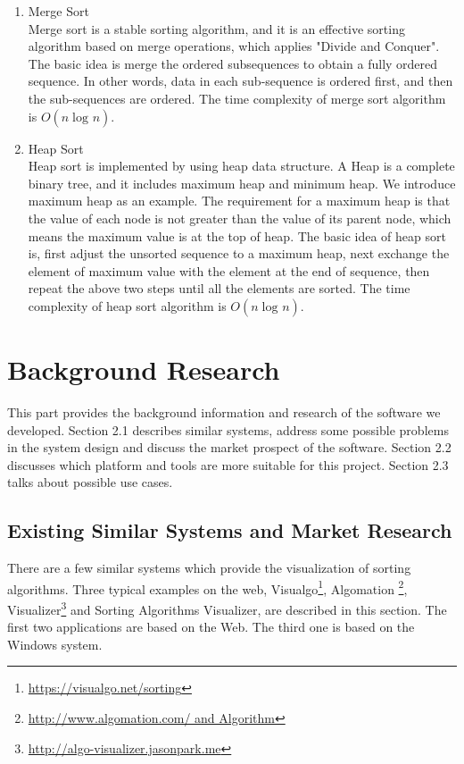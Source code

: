 \documentclass[paper=a4, fontsize=11pt,twoside]{scrartcl}		%
\begin{document}
\begin{enumerate}
\item Merge Sort\\
Merge sort is a stable sorting algorithm, and it is an effective sorting algorithm based on merge operations, which applies "Divide and Conquer". The basic idea is merge the ordered subsequences to obtain a fully ordered sequence. In other words, data in each sub-sequence is ordered first, and then the sub-sequences are ordered. The time complexity of merge sort algorithm is $O(n\log_{}n)$.


\item Heap Sort\\
Heap sort is implemented by using heap data structure. A Heap is a complete binary tree, and it includes maximum heap and minimum heap. We introduce maximum heap as an example. The requirement for a maximum heap is that the value of each node is not greater than the value of its parent node, which means the maximum value is at the top of heap. The basic idea of heap sort is, first adjust the unsorted sequence to a maximum heap, next exchange the element of maximum value with the element at the end of sequence, then repeat the above two steps until all the elements are sorted. The time complexity of heap sort algorithm is $O(n\log_{}n)$.

\end{enumerate}
 

\section{Background Research}
This part provides the background information and research of the software we developed. Section 2.1 describes similar systems, address some possible problems in the system design and discuss the market prospect of the software. Section 2.2 discusses which platform and tools are more suitable for this project. Section 2.3 talks about possible use cases.

\subsection{Existing Similar Systems and Market Research}

There are a few similar systems which provide the visualization of sorting algorithms. Three typical examples on the web, Visualgo\footnote{\url{https://visualgo.net/sorting}}, Algomation \footnote{\url{http://www.algomation.com/ and Algorithm}},  Visualizer\footnote{\url{http://algo-visualizer.jasonpark.me}} and Sorting Algorithms Visualizer, are described in this section. The first two applications are based on the Web. The third one is based on the Windows system. \\
\end{document}
